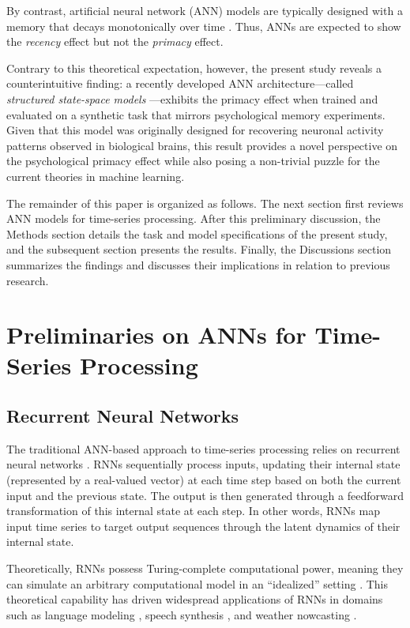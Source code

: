 \documentclass[10pt,letterpaper]{article}
\begin{document}
By contrast, artificial neural network (ANN) models are typically designed with a memory that decays monotonically over time \citep{Bengio+94,Jaeger01,JaegerHaas04}.
Thus, ANNs are expected to show the \emph{recency} effect but not the \emph{primacy} effect.

Contrary to this theoretical expectation, however, the present study reveals a counterintuitive finding: a recently developed ANN architecture---called \emph{structured state-space models} \citep{Gu+20,Gu+22}---exhibits the primacy effect when trained and evaluated on a synthetic task that mirrors psychological memory experiments.
Given that this model was originally designed for recovering neuronal activity patterns observed in biological brains, this result provides a novel perspective on the psychological primacy effect while also posing a non-trivial puzzle for the current theories in machine learning.

The remainder of this paper is organized as follows. The next section first reviews ANN models for time-series processing. After this preliminary discussion, the Methods section details the task and model specifications of the present study, and the subsequent section presents the results. Finally, the Discussions section summarizes the findings and discusses their implications in relation to previous research.

\section{Preliminaries on ANNs for Time-Series Processing}

\subsection{Recurrent Neural Networks}

The traditional ANN-based approach to time-series processing relies on recurrent neural networks 
\citep[RNNs;][]{Elman90}.
RNNs sequentially process inputs, updating their internal state (represented by a real-valued vector) at each time step based on both the current input and the previous state.
The output is then generated through a feedforward transformation of this internal state at each step.
In other words, RNNs map input time series to target output sequences through the latent dynamics of their internal state. 


Theoretically, RNNs possess Turing-complete computational power, meaning they can simulate an arbitrary computational model in an ``idealized'' setting \citep{SiegelmannSontag92,SiegelmannSontag95,Siegelmann99}.
This theoretical capability has driven widespread applications of RNNs in domains such as language modeling \citep{Sundermeyer+12,Graves13}, speech synthesis \citep{Kalchbrenner+18}, and weather nowcasting \citep{Shi+15}.
\end{document}
